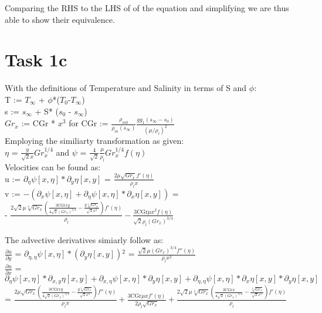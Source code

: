 \documentclass[letterpaper, 10pt]{article}
\begin{document}
	Comparing the RHS to the LHS of of the equation and simplifying we are thus able to show their equivalence.

	\section*{Task 1c} %
	\label{sec:Task 1b}
	With the definitions of Temperature and Salinity in terms of S and $\phi$:\\
	T := $T_\infty$ + $\phi$*($T_0$-$T_\infty$)\\
	s := $s_\infty $ + S* ($s_0$ - $s_\infty $)\\
	$Gr_x$ := CGr * $x^3$ for CGr := $\frac{\rho_{m0}}{\rho_m (s_\infty)}\frac{g g_1 (s_\infty-s_0)}{(\mu/\rho_l)^2}$\\

	\noindent Employing the similiarty transformation as given:\\ 
	$\eta$ = $\frac{y}{\sqrt{2}x} Gr_x^{1/4}$ and $\psi$ = $\frac{4}{\sqrt{2}}\frac{\mu}{\rho_l} Gr_x^{1/4} f(\eta)$\\

	\noindent Velocities can be found as:\\
	u := $\partial_\eta \psi [x,\eta ]*\partial _y\eta [x,y]$ = $\frac{2 \mu  \sqrt{Gr_x} f'(\eta )}{\rho_l x}$\\
	v := $-\left(\partial _x\psi [x,\eta ]+\partial _{\eta }\psi [x,\eta ]*\partial _x\eta [x,y]\right) $ = \\ - $\frac{2 \sqrt{2} \mu  \sqrt[4]{Gr_x} \left(\frac{3 \text{CGr} x y}{4 \sqrt{2} \left(Gr_x\right)^{3/4}}-\frac{y \sqrt[4]{Gr_x}}{\sqrt{2} x^2}\right) f'(\eta )}{\rho_l}-\frac{3 \text{CGr} \mu  x^2 f(\eta )}{\sqrt{2} \rho_l \left(Gr_x\right)^{3/4}}$

	\noindent The advective derivatives simiarly follow as:\\ 
	$\frac{\partial u}{\partial y}$ = $\partial _{\eta ,\eta }\psi [x,\eta ]*\left(\partial _y\eta [x,y]\right){}^2$ = $\frac{\sqrt{2} \mu  \left(Gr_x\right)^{3/4} f''(\eta )}{\rho_l x^2}$\\
	$\frac{\partial u}{\partial x}$ = $\partial _{\eta }\psi [x,\eta ]*\partial _{x,y}\eta [x,y]+\partial _{x,\eta }\psi [x,\eta ]*\partial _y\eta [x,y]+\partial
	_{\eta ,\eta }\psi [x,\eta ]*\partial _x\eta [x,y]*\partial _y\eta [x,y]$ =  $\frac{2 \mu  \sqrt{Gr_x} \left(\frac{3 \text{CGr} x y}{4 \sqrt{2} \left(Gr_x\right)^{3/4}}-\frac{y \sqrt[4]{Gr_x}}{\sqrt{2} x^2}\right) f''(\eta )}{\rho_l x}+\frac{3 \text{CGr} \mu  x f'(\eta )}{2 \rho_l \sqrt{Gr_x}}+\frac{2 \sqrt{2}\mu  \sqrt[4]{Gr_x} \left(\frac{3 \text{CGr} x}{4 \sqrt{2} \left(Gr_x\right)^{3/4}}-\frac{\sqrt[4]{Gr_x}}{\sqrt{2} x^2}\right) f'(\eta )}{\rho_l}$ \\
\end{document}
